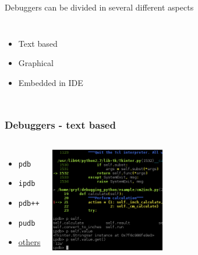 \documentclass[14pt,notes,svgnames,aspectratio=169]{beamer}
\begin{document}
\begin{frame}
    Debuggers can be divided in several different aspects

    \begin{columns}
        \begin{itemize}[<+->]
            \item<1,2,3> Text based
            \item<2,3> Graphical
            \item<3> Embedded in IDE
        \end{itemize}
    \end{columns}
\end{frame}

\begin{frame}
    \frametitle{Debuggers - text based}
    \begin{columns}
        \begin{itemize}
            \item \lstinline{pdb}
            \item \lstinline{ipdb}
            \item \lstinline{pdb++}
            \item \lstinline{pudb}
            \item \color{blue}\href{https://wiki.python.org/moin/PythonDebuggingTools}{\uline{others}}
        \end{itemize}

        \vspace*{0cm}
        \hspace*{0cm}\includegraphics[width=5cm]{"images/ipdb.png"}

    \end{columns}
\end{frame}
\end{document}
